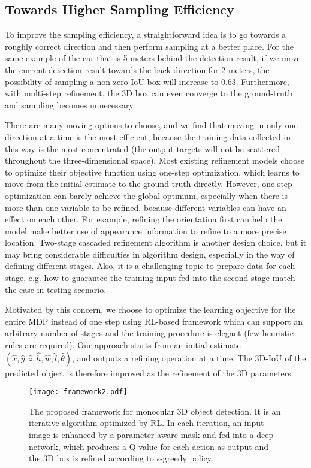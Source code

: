\documentclass[runningheads]{llncs}
\begin{document}
\subsection{Towards Higher Sampling Efficiency}

To improve the sampling efficiency, a straightforward idea is to go towards a roughly correct direction and then perform sampling at a better place. For the same example of the car that is 5 meters behind the detection result, if we move the current detection result towards the back direction for 2 meters, the possibility of sampling a non-zero IoU box will increase to 0.63. Furthermore, with multi-step refinement, the 3D box can even converge to the ground-truth and sampling becomes unnecessary. 

There are many moving options to choose, and we find that moving in only one direction at a time is the most efficient, because the training data collected in this way is the most concentrated (the output targets will not be scattered throughout the three-dimensional space). Most existing refinement models choose to optimize their objective function using one-step optimization, which learns to move from the initial estimate to the ground-truth directly. However, one-step optimization can barely achieve the global optimum, especially when there is more than one variable to be refined, because different variables can have an effect on each other. For example, refining the orientation first can help the model make better use of appearance information to refine to a more precise location. Two-stage cascaded refinement algorithm is another design choice, but it may bring considerable difficulties in algorithm design, especially in the way of defining different stages. Also, it is a challenging topic to prepare data for each stage, e.g. how to guarantee the training input fed into the second stage match the case in testing scenario.

Motivated by this concern, we choose to optimize the learning objective for the entire MDP instead of one step using RL-based framework which can support an arbitrary number of stages and the training procedure is elegant (few heuristic rules are required). Our approach starts from an initial estimate $(\hat{x}, \hat{y}, \hat{z}, \hat{h}, \hat{w}, \hat{l},\hat{\theta})$, and outputs a refining operation at a time. The 3D-IoU of the predicted object is therefore improved as the refinement of the 3D parameters.

\begin{figure}[t]
    \begin{center}
       \texttt{[image: framework2.pdf]}
    \end{center}
   \caption{The proposed framework for monocular 3D object detection. It is an iterative algorithm optimized by RL. In each iteration, an input image is enhanced by a parameter-aware mask and fed into a deep network, which produces a Q-value for each action as output and the 3D box is refined according to $\epsilon$-greedy policy.}
\label{fig:framework}
\end{figure}
\end{document}

